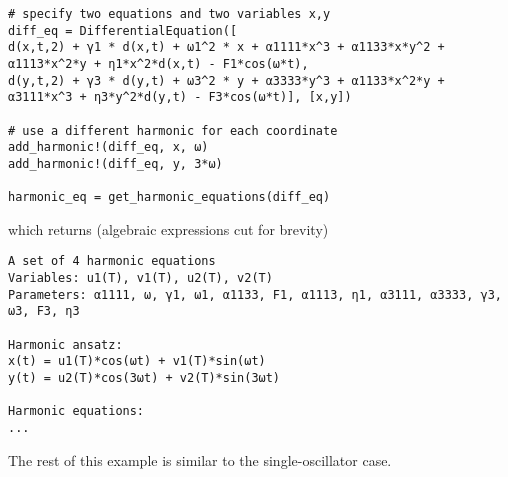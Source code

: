 \begin{lstlisting}[numbers=none]
# specify two equations and two variables x,y
diff_eq = DifferentialEquation([
d(x,t,2) + γ1 * d(x,t) + ω1^2 * x + α1111*x^3 + α1133*x*y^2 + α1113*x^2*y + η1*x^2*d(x,t) - F1*cos(ω*t), 
d(y,t,2) + γ3 * d(y,t) + ω3^2 * y + α3333*y^3 + α1133*x^2*y + α3111*x^3 + η3*y^2*d(y,t) - F3*cos(ω*t)], [x,y])

# use a different harmonic for each coordinate
add_harmonic!(diff_eq, x, ω)
add_harmonic!(diff_eq, y, 3*ω)

harmonic_eq = get_harmonic_equations(diff_eq)
\end{lstlisting}
which returns (algebraic expressions cut for brevity)
\begin{lstlisting}[numbers=none, basicstyle=\scriptsize\ttfamily]
A set of 4 harmonic equations
Variables: u1(T), v1(T), u2(T), v2(T)
Parameters: α1111, ω, γ1, ω1, α1133, F1, α1113, η1, α3111, α3333, γ3, ω3, F3, η3

Harmonic ansatz: 
x(t) = u1(T)*cos(ωt) + v1(T)*sin(ωt)
y(t) = u2(T)*cos(3ωt) + v2(T)*sin(3ωt)

Harmonic equations:
...
\end{lstlisting}
The rest of this example is similar to the single-oscillator case. 

